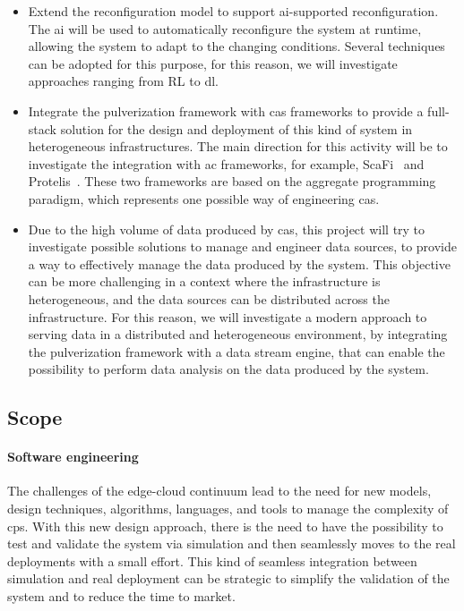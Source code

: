 \documentclass[12pt]{article}
\begin{document}
\begin{itemize}
	\item Extend the reconfiguration model to support \ac{ai}-supported reconfiguration.
	      The \ac{ai} will be used to automatically reconfigure the system at runtime,
	      allowing the system to adapt to the changing conditions.
	      Several techniques can be adopted for this purpose,
	      for this reason,
	      we will investigate approaches ranging from RL to \ac{dl}.
	\item Integrate the pulverization framework with \ac{cas} frameworks to provide a full-stack solution for the design and deployment of this kind of system in heterogeneous infrastructures.
	      The main direction for this activity will be to investigate the integration with \ac{ac} frameworks,
	      for example,
	      ScaFi~\cite{DBLP:journals/softx/CasadeiVAP22} and Protelis~\cite{DBLP:conf/sac/PianiniVB15}.
	      These two frameworks are based on the aggregate programming paradigm,
	      which represents one possible way of engineering \ac{cas}.
	\item Due to the high volume of data produced by \ac{cas},
	      this project will try to investigate possible solutions to manage and engineer data sources,
	      to provide a way to effectively manage the data produced by the system.
	      This objective can be more challenging in a context where the infrastructure is heterogeneous,
	      and the data sources can be distributed across the infrastructure.
	      For this reason,
	      we will investigate a modern approach to serving data in a distributed and heterogeneous environment,
	      by integrating the pulverization framework with a data stream engine,
	      that can enable the possibility to perform data analysis on the data produced by the system.
\end{itemize}

\subsection{Scope}\label{subsec:scope}

\paragraph{Software engineering}
The challenges of the edge-cloud continuum lead to the need for new models,
design techniques, algorithms, languages, and tools to manage the complexity
of \ac{cps}.
%
With this new design approach,
there is the need to have the possibility to test and validate the system via simulation
and then seamlessly moves to the real deployments with a small effort.
%
This kind of seamless integration between simulation and real deployment can be strategic
to simplify the validation of the system and to reduce the time to market.
\end{document}
